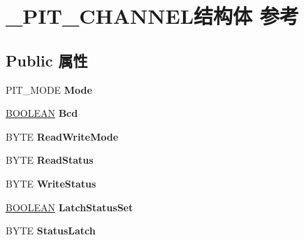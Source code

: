 \hypertarget{struct___p_i_t___c_h_a_n_n_e_l}{}\section{\+\_\+\+P\+I\+T\+\_\+\+C\+H\+A\+N\+N\+E\+L结构体 参考}
\label{struct___p_i_t___c_h_a_n_n_e_l}
\subsection*{Public 属性}
\begin{DoxyCompactItemize}
\item 
\mbox{\label{struct___p_i_t___c_h_a_n_n_e_l_a964170a09a268edc352274f0dd524831}} 
P\+I\+T\+\_\+\+M\+O\+DE {\bfseries Mode}
\item 
\mbox{\label{struct___p_i_t___c_h_a_n_n_e_l_a0521de8c70861c8585372ede86feceae}} 
\hyperlink{_processor_bind_8h_a112e3146cb38b6ee95e64d85842e380a}{B\+O\+O\+L\+E\+AN} {\bfseries Bcd}
\item 
\mbox{\label{struct___p_i_t___c_h_a_n_n_e_l_a289163b32cabb5ee0af22bb1699a5397}} 
B\+Y\+TE {\bfseries Read\+Write\+Mode}
\item 
\mbox{\label{struct___p_i_t___c_h_a_n_n_e_l_a83f50b57b197d484b40bbf68b0067755}} 
B\+Y\+TE {\bfseries Read\+Status}
\item 
\mbox{\label{struct___p_i_t___c_h_a_n_n_e_l_a57524a5b817dc4b497d59b42f717d19b}} 
B\+Y\+TE {\bfseries Write\+Status}
\item 
\mbox{\label{struct___p_i_t___c_h_a_n_n_e_l_a08ec084cf33522053ee3a38d64e032ad}} 
\hyperlink{_processor_bind_8h_a112e3146cb38b6ee95e64d85842e380a}{B\+O\+O\+L\+E\+AN} {\bfseries Latch\+Status\+Set}
\item 
\mbox{\label{struct___p_i_t___c_h_a_n_n_e_l_a92ebd5131f989bcc1bee6f01cbf5259d}} 
B\+Y\+TE {\bfseries Status\+Latch}
\item 
\mbox{\label{struct___p_i_t___c_h_a_n_n_e_l_acf58f6cc437467d8b7e901e299020925}} 

\end{DoxyCompactItemize}
